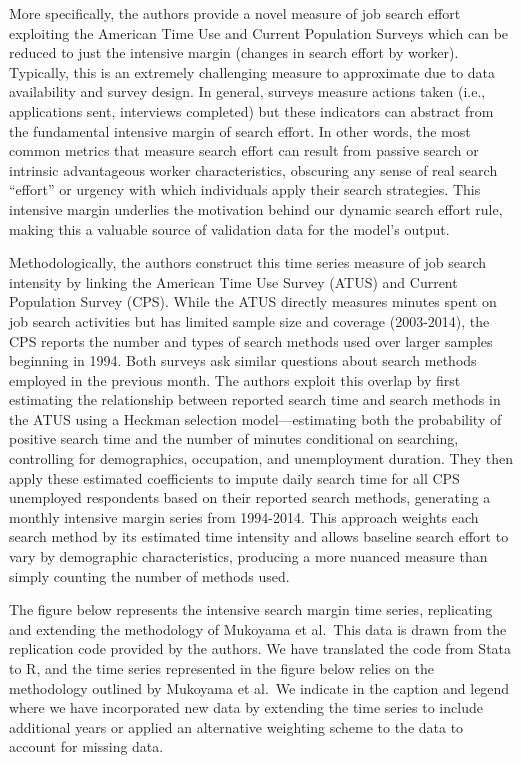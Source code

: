 \documentclass[
]{article}
\begin{document}
More specifically, the authors provide a novel measure of job search
effort exploiting the American Time Use and Current Population Surveys
which can be reduced to just the intensive margin (changes in search
effort by worker). Typically, this is an extremely challenging measure
to approximate due to data availability and survey design. In general,
surveys measure actions taken (i.e., applications sent, interviews
completed) but these indicators can abstract from the fundamental
intensive margin of search effort. In other words, the most common
metrics that measure search effort can result from passive search or
intrinsic advantageous worker characteristics, obscuring any sense of
real search ``effort'' or urgency with which individuals apply their
search strategies. This intensive margin underlies the motivation behind
our dynamic search effort rule, making this a valuable source of
validation data for the model's output.

Methodologically, the authors construct this time series measure of job
search intensity by linking the American Time Use Survey (ATUS) and
Current Population Survey (CPS). While the ATUS directly measures
minutes spent on job search activities but has limited sample size and
coverage (2003-2014), the CPS reports the number and types of search
methods used over larger samples beginning in 1994. Both surveys ask
similar questions about search methods employed in the previous month.
The authors exploit this overlap by first estimating the relationship
between reported search time and search methods in the ATUS using a
Heckman selection model---estimating both the probability of positive
search time and the number of minutes conditional on searching,
controlling for demographics, occupation, and unemployment duration.
They then apply these estimated coefficients to impute daily search time
for all CPS unemployed respondents based on their reported search
methods, generating a monthly intensive margin series from 1994-2014.
This approach weights each search method by its estimated time intensity
and allows baseline search effort to vary by demographic
characteristics, producing a more nuanced measure than simply counting
the number of methods used.

The figure below represents the intensive search margin time series,
replicating and extending the methodology of Mukoyama et al.~This data
is drawn from the replication code provided by the authors. We have
translated the code from Stata to R, and the time series represented in
the figure below relies on the methodology outlined by Mukoyama et
al.~We indicate in the caption and legend where we have incorporated new
data by extending the time series to include additional years or applied
an alternative weighting scheme to the data to account for missing data.
\end{document}
